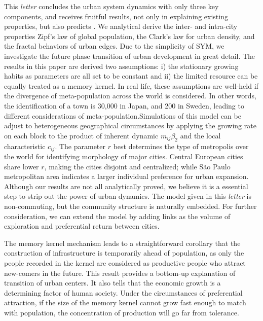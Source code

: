 \documentclass[reprint,unsortedaddress,amsmath,amssymb,floatfix,aps,prl,showkeys]{revtex4-2}
\begin{document}

This \emph{letter} concludes the urban system dynamics with only three key components, and receives fruitful results, not only in explaining existing properties, but also predicts . We analytical derive the inter- and intra-city properties Zipf's law of global population, the Clark's law for urban density, and the fractal behaviors of urban edges. Due to the simplicity of SYM, we investigate the future phase transition of urban development in great detail. The results in this paper are derived two assumptions: i) the stationary growing habits as parameters are all set to be constant and ii) the limited resource can be equally treated as a memory kernel. In real life, these assumptions are well-held if the divergence of meta-population across the world is considered. In other words, the identification of a town is 30,000 in Japan, and 200 in Sweden, leading to different considerations of meta-population.Simulations of this model can be adjust to heterogeneous geographical circumstances by applying the growing rate on each block to the product of inherent dynamic $m_{ij}\beta_2$ and the local characteristic $c_{ij}$. The parameter $r$ best determines the type of metropolis over the world for identifying morphology of major cities. Central European cities share lower $r$, making the cities disjoint and centralized; while São Paulo metropolitan area indicates a larger individual preference for urban expansion. Although our results are not all analytically proved, we believe it is a essential step to strip out the power of urban dynamics. The model given in this \emph{letter} is non-commuting, but the community structure is naturally embedded. For further consideration, we can extend the model by adding links as the volume of exploration and preferential return between cities\cite{WANG2019121921}.

The memory kernel mechanism leads to a straightforward corollary that the construction of infrastructure is temporarily ahead of population, as only the people recorded in the kernel are considered as productive people who attract new-comers in the future. This result provides a bottom-up explanation of transition of urban centers. It also tells that the economic growth is a determining factor of human society. Under the circumstances of preferential attraction, if the size of the memory kernel cannot grow fast enough to match with population, the concentration of production will go far from tolerance.


\end{document}
